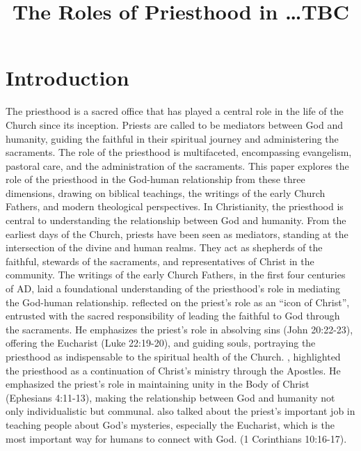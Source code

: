 \documentclass[12pt, doc]{apa7}   	%
\title{The Roles of Priesthood in \dots TBC}
\begin{document}
\maketitle

\section{Introduction}
The priesthood is a sacred office that has played a central role in the life of the Church since its inception. Priests are called to be mediators between God and humanity, guiding the faithful in their spiritual journey and administering the sacraments. The role of the priesthood is multifaceted, encompassing evangelism, pastoral care, and the administration of the sacraments. This paper explores the role of the priesthood in the God-human relationship from these three dimensions, drawing on biblical teachings, the writings of the early Church Fathers, and modern theological perspectives.
In Christianity, the priesthood is central to understanding the relationship between God and humanity. From the earliest days of the Church, priests have been seen as mediators, standing at the intersection of the divine and human realms. They act as shepherds of the faithful, stewards of the sacraments, and representatives of Christ in the community. The writings of the early Church Fathers, in the first four centuries of AD, laid a foundational understanding of the priesthood’s role in mediating the God-human relationship.  \citet{priesthood_chrysostom, complete_work_chrysostom} reflected on the priest’s role as an ``icon of Christ'', entrusted with the sacred responsibility of leading the faithful to God through the sacraments. He emphasizes the priest’s role in absolving sins (John 20:22-23), offering the Eucharist (Luke 22:19-20), and guiding souls, portraying the priesthood as indispensable to the spiritual health of the Church.  \citet{epistles_ignatius}, highlighted the priesthood as a continuation of Christ’s ministry through the Apostles. He emphasized the priest’s role in maintaining unity in the Body of Christ (Ephesians 4:11-13), making the relationship between God and humanity not only individualistic but communal. \citet{st_basil_letters} also talked about the priest’s important job in teaching people about God’s mysteries, especially the Eucharist, which is the most important way for humans to connect with God. (1 Corinthians 10:16-17). 
\end{document}
